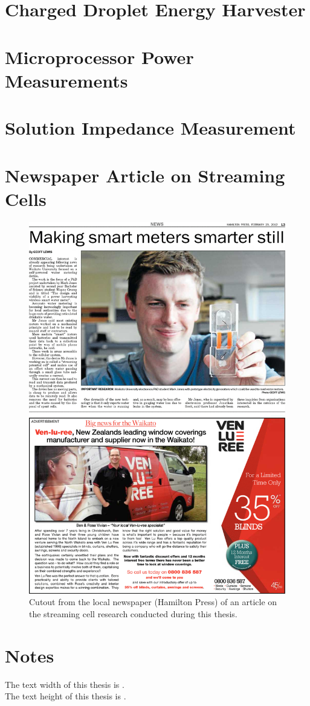   \chapter{Charged Droplet Energy Harvester}
    \label{appendix:chargedDropletts}
    
  \chapter{Microprocessor Power Measurements}
    
  \chapter{Solution Impedance Measurement}
    
  \chapter*{Newspaper Article on Streaming Cells}
  \begin{figure}
      \centering
      \includegraphics[width=\textwidth]{content/appendices/Article}
      \caption{Cutout from the local newspaper (Hamilton Press) of an article on the streaming cell research conducted during this thesis.}
  \end{figure}

\chapter*{Notes}
The text width of this thesis is \the\textwidth.\\
The text height of this thesis is \the\textheight.





